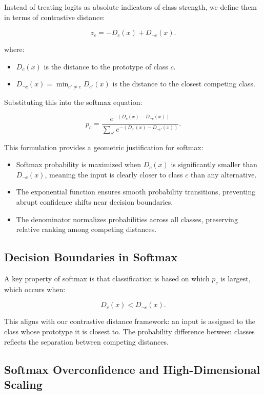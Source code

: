 Instead of treating logits as absolute indicators of class strength, we define them in terms of contrastive distance:

\[
z_c = -D_c(x) + D_{\neg c}(x).
\]

where:

\begin{itemize}
    \item \( D_c(x) \) is the distance to the prototype of class \( c \).
    \item \( D_{\neg c}(x) = \min_{c' \neq c} D_{c'}(x) \) is the distance to the closest competing class.
\end{itemize}

Substituting this into the softmax equation:

\[
p_c = \frac{e^{-(D_c(x) - D_{\neg c}(x))}}{\sum_{c'} e^{-(D_{c'}(x) - D_{\neg c'}(x))}}.
\]

This formulation provides a geometric justification for softmax:

\begin{itemize}
    \item Softmax probability is maximized when \( D_c(x) \) is significantly smaller than \( D_{\neg c}(x) \), meaning the input is clearly closer to class \( c \) than any alternative.
    \item The exponential function ensures smooth probability transitions, preventing abrupt confidence shifts near decision boundaries.
    \item The denominator normalizes probabilities across all classes, preserving relative ranking among competing distances.
\end{itemize}

\subsection{Decision Boundaries in Softmax}

A key property of softmax is that classification is based on which \( p_c \) is largest, which occurs when:

\[
D_c(x) < D_{\neg c}(x).
\]

This aligns with our contrastive distance framework: an input is assigned to the class whose prototype it is closest to. The probability difference between classes reflects the separation between competing distances.

\subsection{Softmax Overconfidence and High-Dimensional Scaling}

